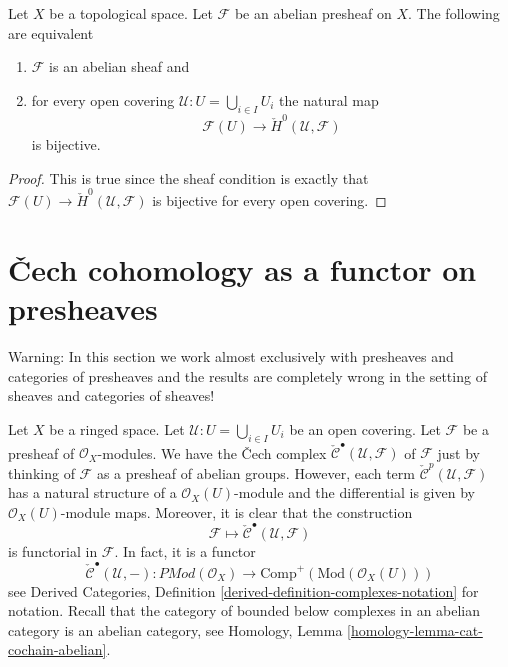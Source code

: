 \begin{lemma}
\label{lemma-cech-h0}
Let $X$ be a topological space.
Let $\mathcal{F}$ be an abelian presheaf on $X$.
The following are equivalent
\begin{enumerate}
\item $\mathcal{F}$ is an abelian sheaf and
\item for every open covering $\mathcal{U} : U = \bigcup_{i \in I} U_i$
the natural map
$$
\mathcal{F}(U) \to \check{H}^0(\mathcal{U}, \mathcal{F})
$$
is bijective.
\end{enumerate}
\end{lemma}

\begin{proof}
This is true since the sheaf condition is exactly that
$\mathcal{F}(U) \to \check{H}^0(\mathcal{U}, \mathcal{F})$
is bijective for every open covering.
\end{proof}






\section{{\v C}ech cohomology as a functor on presheaves}
\label{section-cech-functor}

\noindent
Warning: In this section we work almost exclusively with presheaves and
categories of presheaves and the results are completely wrong in the
setting of sheaves and categories of sheaves!

\medskip\noindent
Let $X$ be a ringed space.
Let $\mathcal{U} : U = \bigcup_{i \in I} U_i$ be an open covering.
Let $\mathcal{F}$ be a presheaf of $\mathcal{O}_X$-modules.
We have the {\v C}ech complex
$\check{\mathcal{C}}^\bullet(\mathcal{U}, \mathcal{F})$
of $\mathcal{F}$ just by thinking of $\mathcal{F}$
as a presheaf of abelian groups. However, each term
$\check{\mathcal{C}}^p(\mathcal{U}, \mathcal{F})$ has a natural
structure of a $\mathcal{O}_X(U)$-module and the differential is given by
$\mathcal{O}_X(U)$-module maps. Moreover, it is clear that the
construction
$$
\mathcal{F} \longmapsto \check{\mathcal{C}}^\bullet(\mathcal{U}, \mathcal{F})
$$
is functorial in $\mathcal{F}$. In fact, it is a functor
\begin{equation}
\label{equation-cech-functor}
\check{\mathcal{C}}^\bullet(\mathcal{U}, -) :
\textit{PMod}(\mathcal{O}_X)
\longrightarrow
\text{Comp}^{+}(\text{Mod}(\mathcal{O}_X(U)))
\end{equation}
see
Derived Categories, Definition \ref{derived-definition-complexes-notation}
for notation. Recall that the category of bounded below complexes
in an abelian category is an abelian category, see
Homology, Lemma \ref{homology-lemma-cat-cochain-abelian}.

